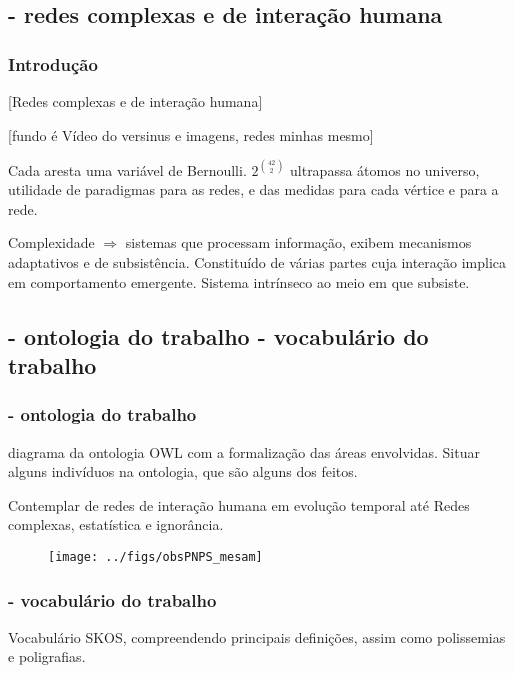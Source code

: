 \documentclass[10pt]{beamer}
\begin{document}
\subsection{- redes complexas e de interação humana}
\begin{frame}
\frametitle{Introdução}
[Redes complexas e de interação humana]


[fundo é Vídeo do versinus e imagens, redes minhas mesmo]

\vspace{1cm}

Cada aresta uma variável de Bernoulli.
$2^{42 \choose 2}$ ultrapassa átomos no universo,
utilidade de paradigmas para as redes,
e das medidas para cada vértice e para a rede.

\vspace{1cm}

Complexidade $\Rightarrow$ sistemas que processam informação,
exibem mecanismos adaptativos e de subsistência.
Constituído de várias partes cuja interação implica
em comportamento emergente. Sistema intrínseco ao meio
em que subsiste.
\end{frame}

\subsection{- ontologia do trabalho \;\; - vocabulário do trabalho}
\begin{frame}
\frametitle{- ontologia do trabalho}
diagrama da ontologia OWL com a formalização das
áreas envolvidas. Situar alguns indivíduos na ontologia,
que são alguns dos feitos.

Contemplar de redes de interação humana em evolução temporal até Redes complexas, estatística e ignorância.
\begin{figure}[!h]
    \texttt{[image: ../figs/obsPNPS\_mesam]}
        \label{fig:mesam}
\end{figure}
\end{frame}


\begin{frame}
\frametitle{- vocabulário do trabalho}
Vocabulário SKOS, compreendendo principais definições, assim como polissemias e poligrafias.
\end{frame}
\end{document}
